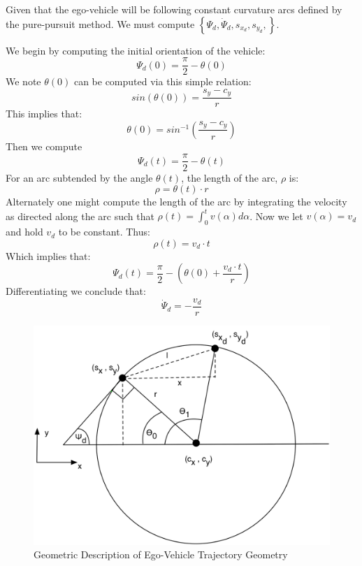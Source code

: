\documentclass{easychair}
\theoremstyle{theorem}
\theoremstyle{remark}
\begin{document}
Given that the ego-vehicle will be following constant curvature arcs defined by the pure-pursuit method. We must compute $\left\{\Psi_d, \dot{\Psi}_d, s_{x_d}, s_{y_d},\right\}$. 

\noindent We begin by computing the initial orientation of the vehicle:
\begin{equation}
	\Psi_d (0) = \frac{\pi}{2}- \theta(0)
\end{equation}
We note $\theta(0)$ can be computed via this simple relation:
\begin{equation}
	sin(\theta(0)) = \frac{s_y-c_y}{r}
\end{equation}
This implies that:
\begin{equation}
	\theta(0) = sin^{-1} \left(\frac{s_y-c_y}{r}\right)
\end{equation}
Then we compute 
\begin{equation}
\Psi_d(t) =  \frac{\pi}{2}-\theta(t)
\end{equation}
For an arc subtended by the angle $\theta(t)$, the length of the arc, $\rho$ is:
\begin{equation}
	\rho = \theta(t) \cdotp r
\end{equation}
Alternately one might compute the length of the arc by integrating the velocity as directed along the arc such that $\rho(t) = \int_{0}^{t}v(\alpha) d\alpha$. Now we let $v(\alpha) = v_d$ and hold $v_d$ to be constant. Thus:
\begin{equation}
	\rho(t) = v_d \cdotp t
\end{equation}
Which implies that:
\begin{equation}
	\Psi_d(t) = \frac{\pi}{2} - \left( \theta(0) + \frac{v_d \cdotp t}{r}\right)
\end{equation}
Differentiating we conclude that:
\begin{equation}
	\dot{\Psi}_d = -\frac{v_d}{r}
\end{equation}
\begin{figure}
	\centering
	\includegraphics[scale=0.5]{figures/traj-track-diagram}
	\caption{Geometric Description of Ego-Vehicle Trajectory Geometry}
\end{figure}
\end{document}
